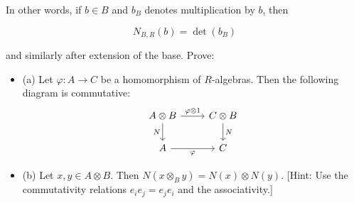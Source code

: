 In other words, if $b \in B$ and $b_B$ denotes multiplication by $b$, then

$$
N_{B, R}(b)=\operatorname{det}\left(b_B\right)
$$

and similarly after extension of the base. Prove:

\begin{itemize}
    \item (a) Let $\varphi: A \rightarrow C$ be a homomorphism of $R$-algebras. Then the following diagram is commutative:
\[\begin{tikzcd}
	{A\otimes{B}} & {C\otimes{B}} \\
	A & C
	\arrow["\varphi\otimes1", from=1-1, to=1-2]
	\arrow["N", from=1-2, to=2-2]
	\arrow["N"', from=1-1, to=2-1]
	\arrow["\varphi"', from=2-1, to=2-2]
\end{tikzcd}\]
    \item (b) Let $x, y \in A \otimes B$. Then $N\left(x \otimes_B y\right)=N(x) \otimes N(y)$. [Hint: Use the commutativity relations $e_i e_j=e_j e_i$ and the associativity.]
\end{itemize}
